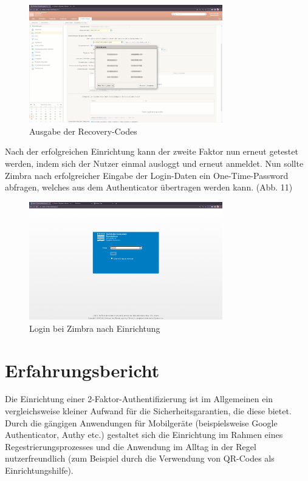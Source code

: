 \documentclass{article}
\begin{document}
\begin{figure}[H]
	\includegraphics[width=0.75\textwidth]{./images/10-recovery-codes.png}
	\centering
	\caption{Ausgabe der Recovery-Codes}
\end{figure}

Nach der erfolgreichen Einrichtung kann der zweite Faktor nun erneut getestet
werden, indem sich der Nutzer einmal ausloggt und erneut anmeldet. Nun sollte
Zimbra nach erfolgreicher Eingabe der Login-Daten ein One-Time-Password
abfragen, welches aus dem Authenticator übertragen werden kann. (Abb. 11)

\begin{figure}[H]
	\includegraphics[width=0.75\textwidth]{./images/11-login-2fa.png}
	\centering
	\caption{Login bei Zimbra nach Einrichtung}
\end{figure}

\section{Erfahrungsbericht}

Die Einrichtung einer 2-Faktor-Authentifizierung ist im Allgemeinen ein
vergleichsweise kleiner Aufwand für die Sicherheitsgarantien, die diese bietet.
Durch die gängigen Anwendungen für Mobilgeräte (beispielsweise Google
Authenticator, Authy etc.) gestaltet sich die Einrichtung im Rahmen eines
Regestrierungsprozesses und die Anwendung im Alltag in der Regel
nutzerfreundlich (zum Beispiel durch die Verwendung von QR-Codes als
Einrichtungshilfe).
\end{document}
